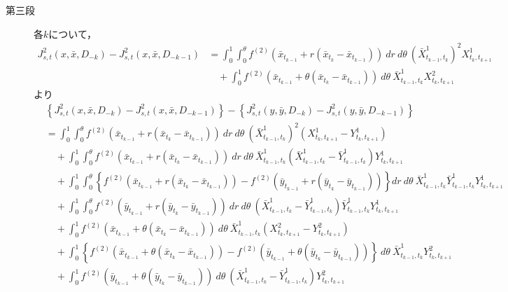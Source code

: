 \begin{prf}
\begin{description}
			\item[第三段] 各$k$について，
				\begin{align}
					J^2_{s,t}(x,\bar{x},D_{-k}) - J^2_{s,t}(x,\bar{x},D_{-k-1})
					&= \int_0^1 \int_0^{\theta} f^{(2)}(\bar{x}_{t_{k-1}} + r(\bar{x}_{t_k} - \bar{x}_{t_{k-1}}))\ dr\ d\theta\ \left(\bar{X}^1_{t_{k-1},t_k}\right)^2 X^1_{t_k,t_{k+1}} \\
					&\quad + \int_0^1 f^{(2)}(\bar{x}_{t_{k-1}} + \theta(\bar{x}_{t_k} - \bar{x}_{t_{k-1}}))\ d\theta\ \bar{X}^1_{t_{k-1},t_k} X^2_{t_k,t_{k+1}} 
				\end{align}
				より
				\begin{align}
					&\left\{ J^2_{s,t}(x,\bar{x},D_{-k}) - J^2_{s,t}(x,\bar{x},D_{-k-1}) \right\}
					- \left\{ J^2_{s,t}(y,\bar{y},D_{-k}) - J^2_{s,t}(y,\bar{y},D_{-k-1}) \right\} \\
					&= \int_0^1 \int_0^{\theta} f^{(2)}(\bar{x}_{t_{k-1}} + r(\bar{x}_{t_k} - \bar{x}_{t_{k-1}}))\ dr\ d\theta\ \left(\bar{X}^1_{t_{k-1},t_k}\right)^2 \left( X^1_{t_k,t_{k+1}} - Y^1_{t_k,t_{k+1}} \right) \\
						&\quad + \int_0^1 \int_0^{\theta} f^{(2)}(\bar{x}_{t_{k-1}} + r(\bar{x}_{t_k} - \bar{x}_{t_{k-1}}))\ dr\ d\theta\ \bar{X}^1_{t_{k-1},t_k} \left(\bar{X}^1_{t_{k-1},t_k} - \bar{Y}^1_{t_{k-1},t_k}\right) Y^1_{t_k,t_{k+1}} \\
						&\quad + \int_0^1 \int_0^{\theta} \left\{ f^{(2)}(\bar{x}_{t_{k-1}} + r(\bar{x}_{t_k} - \bar{x}_{t_{k-1}})) -f^{(2)}(\bar{y}_{t_{k-1}} + r(\bar{y}_{t_k} - \bar{y}_{t_{k-1}})) \right\} dr\ d\theta\ \bar{X}^1_{t_{k-1},t_k} \bar{Y}^1_{t_{k-1},t_k} Y^1_{t_k,t_{k+1}} \\
						&\quad + \int_0^1 \int_0^{\theta} f^{(2)}(\bar{y}_{t_{k-1}} + r(\bar{y}_{t_k} - \bar{y}_{t_{k-1}}))\ dr\ d\theta\ \left( \bar{X}^1_{t_{k-1},t_k} - \bar{Y}^1_{t_{k-1},t_k} \right) \bar{Y}^1_{t_{k-1},t_k} Y^1_{t_k,t_{k+1}} \\
						&\quad + \int_0^1 f^{(2)}(\bar{x}_{t_{k-1}} + \theta(\bar{x}_{t_k} - \bar{x}_{t_{k-1}}))\ d\theta\ \bar{X}^1_{t_{k-1},t_k} \left( X^2_{t_k,t_{k+1}} - Y^2_{t_k,t_{k+1}} \right) \\
						&\quad + \int_0^1 \left\{ f^{(2)}(\bar{x}_{t_{k-1}} + \theta(\bar{x}_{t_k} - \bar{x}_{t_{k-1}})) - f^{(2)}(\bar{y}_{t_{k-1}} + \theta(\bar{y}_{t_k} - \bar{y}_{t_{k-1}})) \right\}\ d\theta\ \bar{X}^1_{t_{k-1},t_k} Y^2_{t_k,t_{k+1}} \\
						&\quad + \int_0^1 f^{(2)}(\bar{y}_{t_{k-1}} + \theta(\bar{y}_{t_k} - \bar{y}_{t_{k-1}}))\ d\theta\ \left(\bar{X}^1_{t_{k-1},t_k} - \bar{Y}^1_{t_{k-1},t_k}\right) Y^2_{t_k,t_{k+1}} \\

\end{align}
\end{description}
\end{prf}
